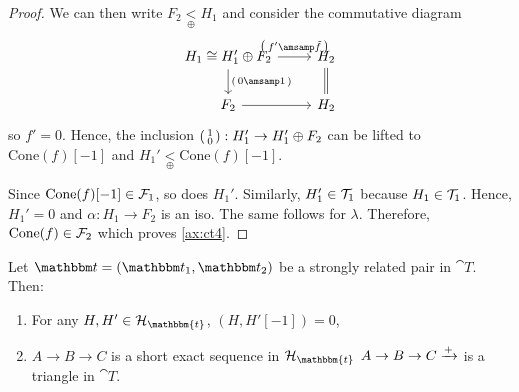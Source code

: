 \begin{proof}
  We can then write $F_2\underset{\oplus}{<}H_1$ and consider the commutative diagram
  \begin{equation*}
    \begin{tikzcd}
      H_1 \cong H_1'\oplus F_2\arrow{r}{
        \begin{psmallmatrix}
          f' \amsamp \tilde{f}
        \end{psmallmatrix}
      }\arrow{d}{
        \begin{psmallmatrix}
          0 \amsamp 1
        \end{psmallmatrix}
      }
        & H_2\arrow[equal]{d}\\
      F_2\arrow{r}
        & H_2
    \end{tikzcd}
  \end{equation*}
  so $f'=0$. Hence, the inclusion $
  \begin{psmallmatrix}
    1 \\ 0
  \end{psmallmatrix}:H_1'\to H_1'\oplus F_2$ can be lifted to
  $\mathrm{Cone}(f)[-1]$ and $H_1'\underset{\oplus}{<}\mathrm{Cone}(f)[-1]$.

  Since $\mathrm{Cone}(f)[-1]\in \mathcal{F}_1$, so does $H_1'$. Similarly,
  $H_1'\in\mathcal{T}_1$ because $H_1\in\mathcal{T}_1$. Hence, $H_1'=0$ and $\alpha:H_1\to F_2$ is an iso.
  The same follows for $\lambda$. Therefore, $\mathrm{Cone}(f)\in\mathcal{F}_2$ which
  proves \ref{ax:ct4}.
\end{proof}


\begin{lemma}\label{lemma_tria}
  Let $\t=(\t_1,\t_2)$ be a strongly related pair in $\cat{T}$. Then:
  \begin{enumerate}
    \item\label{lemma_tria_a} For any $H,H'\in\clH_\mathbbm{t}$, $(H,H'[-1])=0$,
    \item\label{lemma_tria_b} $A\to B\to C$ is a short exact sequence in $\mathcal{H}_\mathbbm{t}$ \iff $A\to B\to C\xrightarrow{+}$ is
      a triangle in $\cat{T}$.
  \end{enumerate}
\end{lemma}


